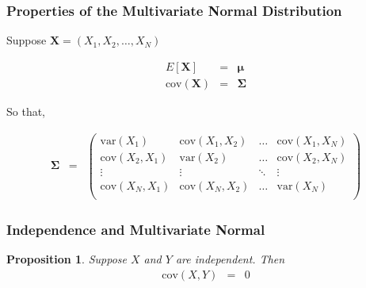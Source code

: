 \documentclass{beamer}
\newtheorem{prop}{Proposition}
\numberwithin{equation}{section}
\begin{document}
\begin{frame}
\frametitle{Properties of the Multivariate Normal Distribution}

Suppose $\boldsymbol{X} = (X_{1}, X_{2}, \hdots, X_{N} ) $

\begin{eqnarray}
E[\boldsymbol{X} ] & = &  \boldsymbol{\mu}\nonumber \\
\text{cov}(\boldsymbol{X} ) & = & \boldsymbol{\Sigma} \nonumber 
\end{eqnarray}

So that, 

\begin{eqnarray}
\boldsymbol{\Sigma}  & = & \begin{pmatrix} 
\text{var}(X_{1}) & \text{cov}(X_{1}, X_{2}) & \hdots & \text{cov}(X_{1}, X_{N}) \\
\text{cov}(X_{2}, X_{1}) & \text{var}(X_{2}) & \hdots & \text{cov}(X_{2}, X_{N} ) \\
\vdots & \vdots & \ddots & \vdots \\
\text{cov}(X_{N}, X_{1} ) & \text{cov}(X_{N}, X_{2} ) & \hdots & \text{var}(X_{N} ) \\
\end{pmatrix} \nonumber 
\end{eqnarray}


\end{frame}


\begin{frame}
\frametitle{Independence and Multivariate Normal}

\begin{prop}
Suppose $X$ and $Y$ are independent.  Then 
\begin{eqnarray}
\text{cov}(X, Y) & = & 0 \nonumber 
\end{eqnarray}

\end{prop}



\end{frame}
\end{document}
